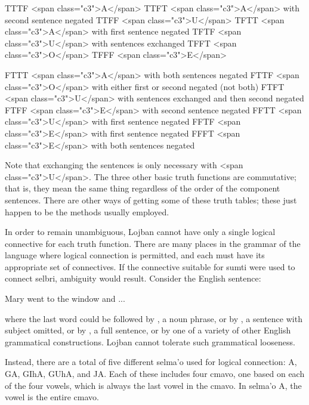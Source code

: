    TTTF    <span class="c3">A</span>
    TTFT    <span class="c3">A</span> with second sentence negated
    TTFF    <span class="c3">U</span>
    TFTT    <span class="c3">A</span> with first sentence negated
    TFTF    <span class="c3">U</span> with sentences exchanged
    TFFT    <span class="c3">O</span>
    TFFF    <span class="c3">E</span>

FTTT    <span class="c3">A</span> with both sentences negated
    FTTF    <span
class="c3">O</span> with either first or second negated (not both)
    FTFT    <span
class="c3">U</span> with sentences exchanged and then second negated
    FTFF    <span class="c3">E</span> with second sentence negated
    FFTT    <span class="c3">U</span> with first sentence negated
    FFTF    <span class="c3">E</span> with first sentence negated
    FFFT    <span class="c3">E</span> with both sentences negated

Note that exchanging the sentences is only necessary with <span
    class="c3">U</span>. The three other basic truth functions are
    commutative; that is, they mean the same thing regardless of
    the order of the component sentences. There are other ways of
    getting some of these truth tables; these just happen to be the
    methods usually employed.



In order to remain unambiguous, Lojban cannot have only a
    single logical connective for each truth function. There are
    many places in the grammar of the language where logical
    connection is permitted, and each must have its appropriate set
    of connectives. If the connective suitable for sumti were used
    to connect selbri, ambiguity would result. Consider the English
    sentence:
\begin{example}
Mary went to the window and  ...
\end{example}

{\noindent}where the last word could be followed by , a noun
    phrase, or by , a sentence with subject
    omitted, or by , a full sentence, or
    by one of a variety of other English grammatical constructions.
    Lojban cannot tolerate such grammatical looseness. 

Instead, there are a total of five different selma'o used
    for logical connection: A, GA, GIhA, GUhA, and JA. Each of
    these includes four cmavo, one based on each of the four
    vowels, which is always the last vowel in the cmavo. In selma'o
    A, the vowel is the entire cmavo.

